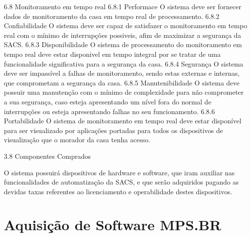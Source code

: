 6.8 Monitoramento em tempo real
6.8.1 Performace
O sistema deve ser fornecer dados de monitoramento da casa em tempo real de processamento.    
6.8.2 Confiabilidade
    O sistema deve ser capaz de satisfazer o monitoramento em tempo real com o mínimo de interrupções possiveis, afim de maximizar a segurança da SACS.
6.8.3 Disponibilidade
    O sistema de processamento do monitoramento em tempo real deve estar disponivel em tempo integral por se tratar de uma funcionalidade significativa para a segurança da casa.
6.8.4 Segurança
    O sistema deve ser impassível a falhas de monitoramento, sendo estas externas e internas, que comprometam a segurança da casa.
6.8.5 Manutenibilidade
    O sistema deve possuir uma manutenção com o mínimo de complexidade para não comprometer a sua segurança, caso esteja apresentando um nível fora do normal de interrupções ou esteja apresentando falhas no seu funcionamento.
6.8.6 Portabilidade
    O sistema de monitoramento em tempo real deve estar disponível para ser visualizado por aplicações portadas para todos os dispositivos de visualização que o morador da casa tenha acesso.



3.8     Componentes Comprados
    
O sistema possuirá dispositivos de hardware e software, que iram auxiliar nas funcionalidades de automatização da SACS, e que serão adquiridos pagando as devidas taxas referentes ao licenciamento e operabilidade destes dispositivos.



\chapter{Aquisição de Software MPS.BR}




